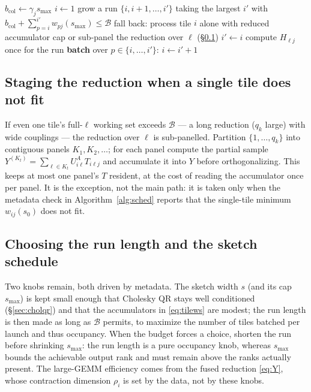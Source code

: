 \documentclass[11pt]{article}
\begin{document}
\begin{algorithm}[H]
\caption{\textsc{Schedule} --- workspace-bounded column-major traversal}
\label{alg:sched}
\begin{algorithmic}[1]
     \State $b_{\mathrm{col}}\gets\gamma_j s_{\max}$
     \State $i\gets1$
        \State grow a run $\{i,i+1,\dots,i'\}$ taking the largest $i'$ with
               $b_{\mathrm{col}}+\sum_{p=i}^{i'}w_{pj}(s_{\max})\le\mathcal B$
           \State fall back: process tile $i$ alone with reduced accumulator cap
                  or sub-panel the reduction over $\ell$ (\S\ref{sec:staging})
           \State $i'\gets i$
        \EndIf
        \State compute $H_{\ell j}$ once for the run
        \State \textbf{batch} over $p\in\{i,\dots,i'\}$:
        \State $i\gets i'+1$
     \EndWhile
  \EndFor
\EndProcedure
\end{algorithmic}
\end{algorithm}

\subsection{Staging the reduction when a single tile does not fit}
\label{sec:staging}

If even one tile's full-$\ell$ working set exceeds $\mathcal B$ --- a long
reduction ($q_k$ large) with wide couplings --- the reduction over $\ell$ is
sub-panelled. Partition $\{1,\dots,q_k\}$ into contiguous panels
$K_1,K_2,\dots$; for each panel compute the partial sample
$Y^{(K_t)}=\sum_{\ell\in K_t}U^A_{i\ell}T_{i\ell j}$ and accumulate it into $Y$
before orthogonalizing. This keeps at most one panel's $T$ resident, at the cost
of reading the accumulator once per panel. It is the exception, not the main
path: it is taken only when the metadata check in Algorithm~\ref{alg:sched}
reports that the single-tile minimum $w_{ij}(s_0)$ does not fit.

\subsection{Choosing the run length and the sketch schedule}
\label{sec:choose}

Two knobs remain, both driven by metadata. The sketch width $s$ (and its cap
$s_{\max}$) is kept small enough that Cholesky QR stays well conditioned
(\S\ref{sec:cholqr}) and that the accumulators in \eqref{eq:tilews} are modest;
the run length is then made as long as $\mathcal B$ permits, to maximize the
number of tiles batched per launch and thus occupancy. When the budget forces a
choice, shorten the run before shrinking $s_{\max}$: the run length is a pure
occupancy knob, whereas $s_{\max}$ bounds the achievable output rank and must
remain above the ranks actually present. The large-GEMM efficiency comes from the
fused reduction \eqref{eq:Y}, whose contraction dimension $\rho_i$ is set by the
data, not by these knobs.
\end{document}
